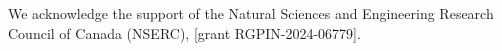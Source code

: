 \documentclass[runningheads]{llncs}
\newcommand{\Set}[2]{%
  \{\, #1 \mid #2 \, \}%
}
\begin{document}





\begin{credits}
\subsubsection{\ackname} We acknowledge the support of the Natural Sciences and Engineering Research Council of Canada (NSERC), [grant RGPIN-2024-06779].
\end{credits}

%
%
%
% 
% 
%
\printbibliography




\end{document}
